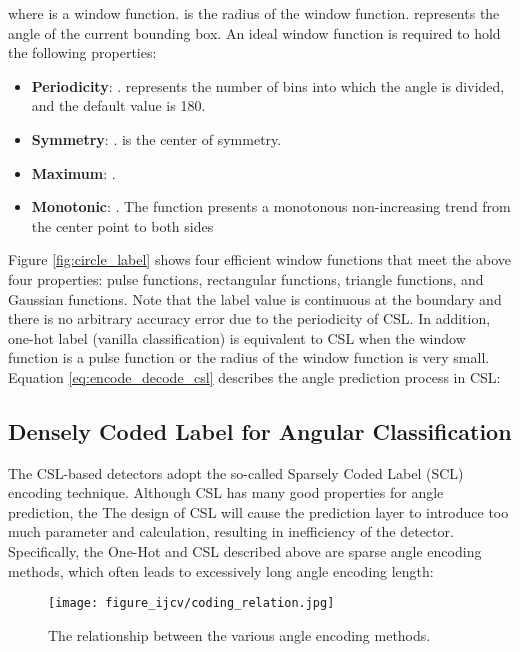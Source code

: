 \documentclass[10pt,journal,compsoc]{IEEEtran}
\begin{document}
where  is a window function.  is the radius of the window function.  represents the angle of the current bounding box. An ideal window function  is required to hold the following properties:
\begin{itemize}
	\item \textbf{Periodicity}: .  represents the number of bins into which the angle is divided, and the default value is 180.
	\item \textbf{Symmetry}: .  is the center of symmetry.
	\item \textbf{Maximum}: .
	\item \textbf{Monotonic}: . The function presents a monotonous non-increasing trend from the center point to both sides
\end{itemize}

Figure \ref{fig:circle_label} shows four efficient window functions that meet the above four properties: pulse functions, rectangular functions, triangle functions, and Gaussian functions. Note that the label value is continuous at the boundary and there is no arbitrary accuracy error due to the periodicity of CSL. In addition, one-hot label (vanilla classification) is equivalent to CSL when the window function is a pulse function or the radius of the window function is very small. Equation \ref{eq:encode_decode_csl} describes the angle prediction process in CSL:


\subsection{Densely Coded Label for Angular Classification}\label{sec:dcl}
The CSL-based detectors adopt the so-called Sparsely Coded Label (SCL) encoding technique.
Although CSL has many good properties for angle prediction, the The design of CSL will cause the prediction layer to introduce too much parameter and calculation, resulting in inefficiency of the detector. Specifically, the One-Hot and CSL described above are sparse angle encoding methods, which often leads to excessively long angle encoding length:


\begin{figure}[!tb]
	\centering
	\texttt{[image: figure\_ijcv/coding\_relation.jpg]}
	\caption{The relationship between the various angle encoding methods.}
	\label{fig:coding_relation}
\end{figure}
\end{document}

